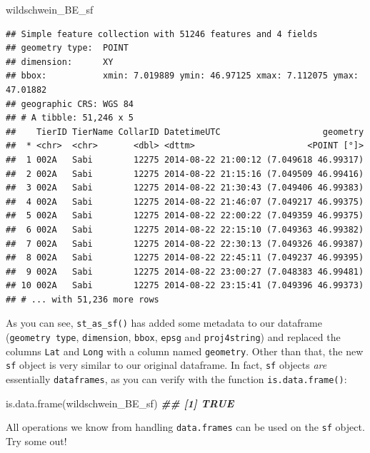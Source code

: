 \documentclass[
]{book}
\newenvironment{Shaded}{\begin{snugshade}}{\end{snugshade}}
\newcommand{\DocumentationTok}[1]{\textcolor[rgb]{0.56,0.35,0.01}{\textbf{\textit{#1}}}}
\newcommand{\FunctionTok}[1]{\textcolor[rgb]{0.00,0.00,0.00}{#1}}
\newcommand{\NormalTok}[1]{#1}
\begin{document}
\begin{Shaded}
\begin{Highlighting}[]
\NormalTok{wildschwein\_BE\_sf}
\end{Highlighting}
\end{Shaded}

\begin{verbatim}
## Simple feature collection with 51246 features and 4 fields
## geometry type:  POINT
## dimension:      XY
## bbox:           xmin: 7.019889 ymin: 46.97125 xmax: 7.112075 ymax: 47.01882
## geographic CRS: WGS 84
## # A tibble: 51,246 x 5
##    TierID TierName CollarID DatetimeUTC                    geometry
##  * <chr>  <chr>       <dbl> <dttm>                      <POINT [°]>
##  1 002A   Sabi        12275 2014-08-22 21:00:12 (7.049618 46.99317)
##  2 002A   Sabi        12275 2014-08-22 21:15:16 (7.049509 46.99416)
##  3 002A   Sabi        12275 2014-08-22 21:30:43 (7.049406 46.99383)
##  4 002A   Sabi        12275 2014-08-22 21:46:07 (7.049217 46.99375)
##  5 002A   Sabi        12275 2014-08-22 22:00:22 (7.049359 46.99375)
##  6 002A   Sabi        12275 2014-08-22 22:15:10 (7.049363 46.99382)
##  7 002A   Sabi        12275 2014-08-22 22:30:13 (7.049326 46.99387)
##  8 002A   Sabi        12275 2014-08-22 22:45:11 (7.049237 46.99395)
##  9 002A   Sabi        12275 2014-08-22 23:00:27 (7.048383 46.99481)
## 10 002A   Sabi        12275 2014-08-22 23:15:41 (7.049396 46.99373)
## # ... with 51,236 more rows
\end{verbatim}

As you can see, \texttt{st\_as\_sf()} has added some metadata to our dataframe (\texttt{geometry\ type}, \texttt{dimension}, \texttt{bbox}, \texttt{epsg} and \texttt{proj4string}) and replaced the columns \texttt{Lat} and \texttt{Long} with a column named \texttt{geometry}. Other than that, the new \texttt{sf} object is very similar to our original dataframe. In fact, \texttt{sf} objects \emph{are} essentially \texttt{dataframes}, as you can verify with the function \texttt{is.data.frame()}:

\begin{Shaded}
\begin{Highlighting}[]
\FunctionTok{is.data.frame}\NormalTok{(wildschwein\_BE\_sf)}
\DocumentationTok{\#\# [1] TRUE}
\end{Highlighting}
\end{Shaded}

All operations we know from handling \texttt{data.frames} can be used on the \texttt{sf} object. Try some out!
\end{document}
